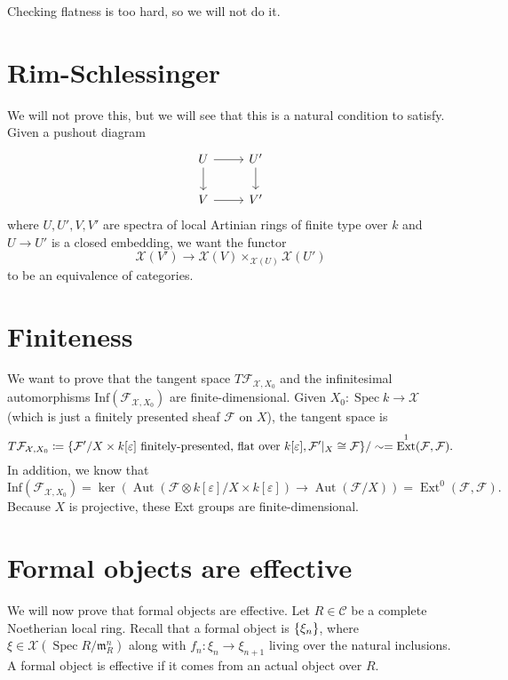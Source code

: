 \documentclass[leqno, openany]{memoir}
\theoremstyle{definition}
\theoremstyle{remark}
\theoremstyle{plain}
\theoremstyle{definition}
\theoremstyle{remark}
\newcommand{\ep}{\varepsilon}
\newcommand{\mc}[1]{\mathcal{#1}}
\newcommand{\mf}[1]{\mathfrak{#1}}
\newcommand{\mr}[1]{\mathrm{#1}}
\newcommand{\wh}[1]{\widehat{#1}}
\DeclareMathOperator{\Ext}{Ext}
\DeclareMathOperator{\Aut}{Aut}
\DeclareMathOperator{\Spec}{Spec}
\begin{document}
Checking flatness is too hard, so we will not do it.

\section{Rim-Schlessinger}%
\label{sec:rim_schlessinger}

We will not prove this, but we will see that this is a natural condition to satisfy. Given a pushout diagram
\begin{equation*}
\begin{tikzcd}
    U \ar{r} \ar{d} & U' \ar{d} \\
    V \ar{r} & V'
\end{tikzcd}
\end{equation*}
where $U, U', V, V'$ are spectra of local Artinian rings of finite type over $k$ and $U \to U'$ is a closed embedding, we want the functor
\[ \mc{X}(V') \to \mc{X}(V) \times_{\mc{X}(U)} \mc{X}(U') \]
to be an equivalence of categories.

\section{Finiteness}%
\label{sec:finiteness}

We want to prove that the tangent space $T \mc{F}_{\mc{X}, X_0}$ and the infinitesimal automorphisms $\mr{Inf}(\mc{F}_{\mc{X}, X_0})$ are finite-dimensional. Given $X_0 \colon \Spec k \to \mc{X}$ (which is just a finitely presented sheaf $\mc{F}$ on $X$), the tangent space is
\[ T \mc{F}_{\mc{X}, X_0} \coloneqq \qty{\mc{F'} / X \times k[\ep] \text{ finitely-presented, flat over }k[\ep], \mc{F'}|_X \cong \mc{F}} / \sim = \Ext^1(\mc{F}, \mc{F}). \]
In addition, we know that
\[ \mr{Inf}(\mc{F}_{\mc{X}, X_0}) = \ker(\Aut(\mc{F} \otimes k[\ep] / X \times k[\ep]) \to \Aut(\mc{F}/X)) = \Ext^0(\mc{F}, \mc{F}). \]
Because $X$ is projective, these Ext groups are finite-dimensional.

\section{Formal objects are effective}%
\label{sec:formal_objects_are_effective}

We will now prove that formal objects are effective. Let $R \in \wh{\mc{C}}$ be a complete Noetherian local ring. Recall that a formal object is $\qty{\xi_n}$, where $\xi \in \mc{X}(\Spec R/\mf{m}_R^n)$ along with $f_n \colon \xi_n \to \xi_{n+1}$ living over the natural inclusions. A formal object is effective if it comes from an actual object over $R$.
\end{document}
